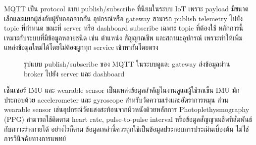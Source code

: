 MQTT เป็น protocol แบบ publish/subscribe ที่นิยมในระบบ IoT เพราะ payload มีขนาดเล็กและแยกผู้ส่งกับผู้รับออกจากกัน อุปกรณ์หรือ gateway สามารถ publish telemetry ไปยัง topic ที่กำหนด ขณะที่ server หรือ dashboard subscribe เฉพาะ topic ที่ต้องใช้ หลักการนี้เหมาะกับระบบที่มีข้อมูลหลายชนิด เช่น ตำแหน่ง สัญญาณชีพ และสถานะอุปกรณ์ เพราะทำให้เพิ่มแหล่งข้อมูลใหม่ได้โดยไม่ต้องผูกทุก service เข้าหากันโดยตรง \cite{MQTTSpec,Mishra2018_MQTT_survey}

\begin{figure}[htbp]
    \centering
    \caption{รูปแบบ publish/subscribe ของ MQTT ในระบบดูแล: gateway ส่งข้อมูลผ่าน broker ไปยัง server และ dashboard}
    \label{fig:ch2_mqtt_pubsub}
\end{figure}


เซ็นเซอร์ IMU และ wearable sensor เป็นแหล่งข้อมูลสำคัญในงานดูแลผู้ใช้รถเข็น IMU มักประกอบด้วย accelerometer และ gyroscope สำหรับวัดความเร่งและอัตราการหมุน ส่วน wearable sensor เช่นอุปกรณ์วัดแสงสะท้อนจากผิวหนังด้วยหลักการ Photoplethysmography (PPG) สามารถใช้ติดตาม heart rate, pulse-to-pulse interval หรือข้อมูลสัญญาณชีพที่สัมพันธ์กับภาวะร่างกายได้ \cite{PolarBLESDK,PolarVeritySenseWhitepaper} อย่างไรก็ตาม ข้อมูลเหล่านี้ควรถูกใช้เป็นข้อมูลประกอบการประเมินเบื้องต้น ไม่ใช่การวินิจฉัยทางการแพทย์

